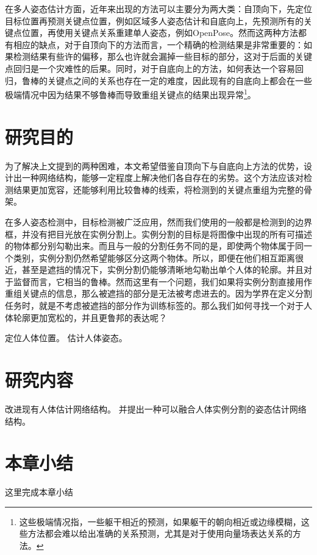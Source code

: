在多人姿态估计方面，近年来出现的方法可以主要分为两大类：自顶向下，先定位目标位置再预测关键点位置，例如区域多人姿态估计\cite{fang2017rmpe}和自底向上，先预测所有的关键点位置，再使用关键点关系重建单人姿态，例如OpenPose\cite{Cao2016Realtime}。然而这两种方法都有相应的缺点，对于自顶向下的方法而言，一个精确的检测结果是非常重要的：如果检测结果有些许的偏移，那么也许就会漏掉一些目标的部分，这对于后面的关键点回归是一个灾难性的后果。同时，对于自底向上的方法，如何表达一个容易回归，鲁棒的关键点之间的关系也存在一定的难度，因此现有的自底向上都会在一些极端情况中因为结果不够鲁棒而导致重组关键点的结果出现异常\footnote{这些极端情况指，一些躯干相近的预测，如果躯干的朝向相近或边缘模糊，这些方法都会难以给出准确的关系预测，尤其是对于使用向量场表达关系的方法。}。

\section{研究目的}
\label{sec:generalmotivation}
为了解决上文提到的两种困难，本文希望借鉴自顶向下与自底向上方法的优势，设计出一种网络结构，能够一定程度上解决他们各自存在的劣势。这个方法应该对检测结果更加宽容，还能够利用比较鲁棒的线索，将检测到的关键点重组为完整的骨架。

在多人姿态检测中，目标检测被广泛应用，然而我们使用的一般都是检测到的边界框，并没有把目光放在实例分割上。实例分割的目标是将图像中出现的所有可描述的物体都分别勾勒出来。而且与一般的分割任务不同的是，即使两个物体属于同一个类别，实例分割仍然希望能够区分这两个物体。所以，即便在他们相互距离很近，甚至是遮挡的情况下，实例分割仍能够清晰地勾勒出单个人体的轮廓。并且对于监督而言，它相当的鲁棒。然而这里有一个问题，我们如果将实例分割直接用作重组关键点的信息，那么被遮挡的部分是无法被考虑进去的。因为学界在定义分割任务时，就是不考虑被遮挡的部分作为训练标签的。那么我们如何寻找一个对于人体轮廓更加宽松的，并且更鲁邦的表达呢？


定位人体位置。
估计人体姿态。

\section{研究内容}
\label{sec:generalfield}
改进现有人体估计网络结构。
并提出一种可以融合人体实例分割的姿态估计网络结构。

\section{本章小结}
这里完成本章小结